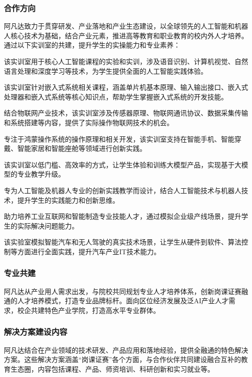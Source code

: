 \subsubsection{合作方向}
阿凡达致力于贯穿研发、产业落地和产业生态建设，以全球领先的人工智能和机器人核心技术为基础，结合产业元素，推进高等教育和职业教育的校内外人才培养。通过以下实训室的共建，提升学生的实操能力和专业素养：

该实训室用于核心人工智能课程的实验和实训，涉及语音识别、计算机视觉、自然语言处理和深度学习等技术，为学生提供全面的人工智能实践体验。

该实训室针对嵌入式系统相关课程，涵盖单片机基本原理、输入输出接口、嵌入式处理器和嵌入式系统等核心知识点，帮助学生掌握嵌入式系统的开发技能。

结合物联网产业技术，该实训室涉及传感器原理、物联网通讯协议、数据采集传输和系统搭建等内容，提供了实际操作物联网技术的机会。

专注于鸿蒙操作系统的操作原理和相关开发，该实训室支持在智能手机、智能穿戴、智能家居和智能座舱等领域进行创新实践。

该实训室以低门槛、高效率的方式，让学生体验和训练大模型产品，实现基于大模型的专业教学升级。

专为人工智能及机器人专业的创新实践教学而设计，结合人工智能技术与机器人技术，提升学生的实践能力和创新思维。

助力培养工业互联网和智能制造专业技能人才，通过模拟企业级产线场景，提升学生的实际解决问题能力。

该实验室模拟智能汽车和无人驾驶的真实技术场景，让学生从硬件到软件、算法控制等方面进行全面实践，提升汽车产业IT技术能力。

\subsubsection{专业共建}
阿凡达从产业用人需求出发，与院校共同规划专业人才培养体系，创新岗课证赛融通的人才培养模式，打造专业品牌标杆。面向区位经济发展及泛AI产业人才需求，校企共建特色产业学院，打造高水平专业群体。

\subsubsection{解决方案建设内容}
阿凡达结合在产业领域的技术研发、产品应用和落地经验，提供全融通的特色解决方案。这些解决方案涵盖“岗课证赛”各个方面，与合作伙伴共同建设融合互补的教育生态圈，内容包括课程、产品、师资培训、科研创新和实习就业等。


